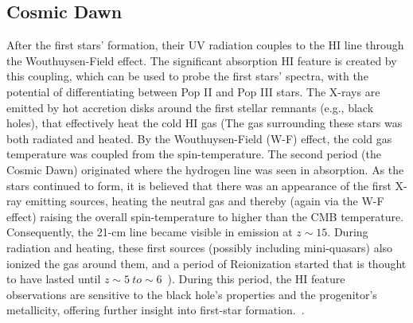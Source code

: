 \documentclass[12pt,a4paper]{report}
\begin{document}
%	
	\subsection{Cosmic Dawn}
	    
	    After the first stars' formation, their UV radiation couples to the HI line through the Wouthuysen-Field effect. The significant absorption HI feature is created by this coupling, which can be used to probe the first stars' spectra, with the potential of differentiating between Pop II and Pop III stars. The X-rays are emitted by hot accretion disks around the first stellar remnants (e.g., black holes), that effectively heat the cold HI gas (The gas surrounding these stars was both radiated and heated. By the Wouthuysen-Field (W-F) effect, the cold gas temperature was coupled from the spin-temperature. The second period (the Cosmic Dawn) originated where the hydrogen line was seen in absorption. As the stars continued to form, it is believed that there was an appearance of the first X-ray emitting sources, heating the neutral gas and thereby (again via the W-F effect) raising the overall spin-temperature to higher than the CMB temperature.\\
	    
	    
	    Consequently, the 21-cm line became visible in emission at $z\sim15$. During radiation and heating, these first sources (possibly including mini-quasars) also ionized the gas around them, and a period of Reionization started that is thought to have lasted until $z\sim5~to\sim 6$~\citep{2015aska.confE...1K}). During this period, the HI feature observations are sensitive to the black hole's properties and the progenitor's metallicity, offering further insight into first-star formation.~\citep{11}.\\ 
	    
\end{document}
